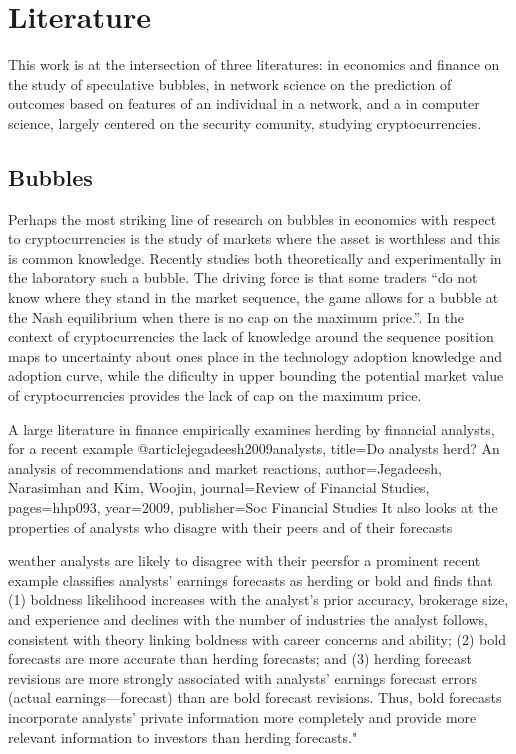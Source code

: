 \section{Literature}

This work is at the intersection of three literatures: in economics and finance on the study of speculative bubbles, in network science on the prediction of outcomes based on features of an individual in a network, and a in computer science, largely centered on the security comunity, studying cryptocurrencies.


\subsection{Bubbles}

Perhaps the most striking line of research on bubbles in economics with respect to cryptocurrencies is the study of markets where the asset is worthless and this is common knowledge. 
Recently \cite{moinas2013bubble} studies both theoretically and experimentally in the laboratory such a bubble. 
The driving force is that some traders ``do not know where they stand in the market sequence, the game allows for
a bubble at the Nash equilibrium when there is no cap on the maximum price.''.
In the context of cryptocurrencies the lack of knowledge around the sequence position maps to uncertainty about ones place in the technology adoption knowledge and adoption curve, while the dificulty in upper bounding the potential market value of cryptocurrencies provides the lack of cap on the maximum price. 


A large literature in finance empirically examines herding by financial analysts, for a recent example
@article{jegadeesh2009analysts,
  title={Do analysts herd? An analysis of recommendations and market reactions},
  author={Jegadeesh, Narasimhan and Kim, Woojin},
  journal={Review of Financial Studies},
  pages={hhp093},
  year={2009},
  publisher={Soc Financial Studies}
}
It also looks at the properties of analysts who disagre with their peers and of their forecasts

 \cite{clement2005financial} 
weather analysts are likely to disagree with their peersfor a prominent recent example classifies analysts' earnings forecasts as herding or bold and finds that (1) boldness likelihood increases with the analyst's prior accuracy, brokerage size, and experience and declines with the number of industries the analyst follows, consistent with theory linking boldness with career concerns and ability; (2) bold forecasts are more accurate than herding forecasts; and (3) herding forecast revisions are more strongly associated with analysts' earnings forecast errors (actual earnings—forecast) than are bold forecast revisions. Thus, bold forecasts incorporate analysts' private information more completely and provide more relevant information to investors than herding forecasts."

